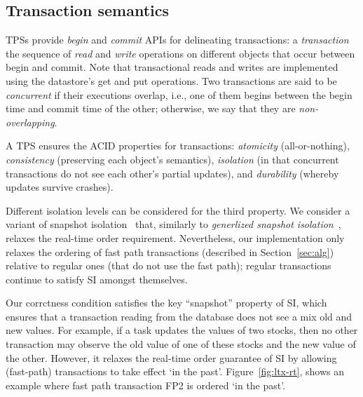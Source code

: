 \subsection{Transaction semantics} \label{ssec:transactions}

TPSs provide \emph{begin} and \emph{commit} APIs for delineating transactions: 
a \emph{transaction} the sequence of \emph{read} and \emph{write} operations on different objects 
that occur between begin and commit. Note that transactional reads and writes are implemented using the 
datastore's get and put operations.
Two transactions are said to be \emph{concurrent} if 
their executions overlap, i.e., one of them begins between the begin time and commit time of the other;
otherwise, we say that they are \emph{non-overlapping}.

A TPS  ensures the ACID properties for transactions:
\emph{atomicity} (all-or-nothing), \emph{consistency} (preserving each object's semantics), 
\emph{isolation} (in that concurrent transactions do not see each other's partial updates), and 
\emph{durability} (whereby updates survive crashes).

Different isolation levels can be considered for the third property. We consider a variant of 
snapshot isolation~\cite{DBLP:conf/sigmod/BerensonBGMOO95} that, similarly to \emph{generlized snapshot isolation}~\cite{DBLP:conf/srds/ElniketyZP05}, relaxes  the real-time order requirement. 
Nevertheless, our implementation only relaxes the ordering of fast path  transactions (described in Section~\ref{sec:alg}) 
relative to regular ones (that do not use the fast path); regular transactions continue to satisfy SI amongst themselves. 

Our corrctness condition satisfies the key ``snapshot'' property of SI, which ensures that a transaction reading from the  database
does not see a mix old and new values. For example, if a task updates the values of two stocks, 
then no other transaction may observe the old value of one of these stocks and the new value of the other.
However, it relaxes the real-time order guarantee of SI by allowing (fast-path) transactions to take effect `in the past'.  
Figure~\ref{fig:ltx-rt}, shows an example where fast path transaction FP2 is ordered `in the past'.

